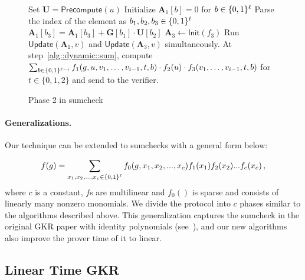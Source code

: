 \begin{figure}[t!]
	\begin{algorithm}[H]
		\caption{Phase 2 in sumcheck}\label{alg::phase2}
		\begin{algorithmic}[1]
			\State Set $\textbf{U} = \mathsf{Precompute}(u)$
			\State Initialize $\textbf{A}_1[b] = 0$ for $b\in\{0,1\}^\ell$
			\State Parse the index of the element as $b_1,b_2,b_3\in\{0,1\}^\ell$
			\State\label{alg::phase2::init} $\textbf{A}_1[b_3] = \textbf{A}_1[b_3]+ \textbf{G}[b_1]\cdot\textbf{U}[b_2]$
			\EndFor
			\EndProcedure
			\State $\textbf{A}_3\leftarrow\mathsf{Init}(f_3)$
			\State Run $\mathsf{Update}(\textbf{A}_1, v)$ and $\mathsf{Update}(\textbf{A}_3,v)$ simultaneously. At step~\ref{alg::dynamic::sum}, compute $\sum_{b\in\{0,1\}^{\ell-i}}f_1(g,u, v_1, \ldots,v_{i-1}, t, b)\cdot f_2(u)\cdot f_3(v_1, \ldots,v_{i-1}, t, b)$ for $t\in\{0,1,2\}$ and send to the verifier.
			\EndProcedure
		\end{algorithmic}
	\end{algorithm}
\end{figure}


\paragraph{Generalizations.}
Our technique can be extended to sumchecks with a general form below:

\[
f(g) = \sum\limits_{x_1, x_2, ..., x_c\in\{0,1\}^\ell}f_0(g,x_1, x_2, ..., x_c)f_1(x_1)f_2(x_2)...f_c(x_c)\, ,
\]
where $c$ is a constant, $f$s are multilinear and $f_0()$ is sparse and consists of linearly many nonzero monomials. We divide the protocol into $c$ phases similar to the algorithms described above. This generalization captures the sumcheck in the original GKR paper with identity polynomials (see~\cite{GKR}), and our new algorithms also improve the prover time of it to linear.

\subsection{Linear Time GKR}

